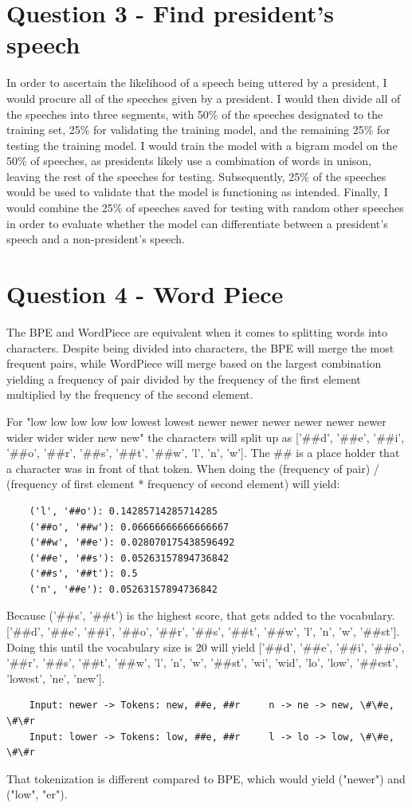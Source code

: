 \documentclass{article}
\begin{document}
\section{Question 3 - Find president's speech}

In order to ascertain the likelihood of a speech being uttered by a president, I would procure all of the speeches given by a president. I would then divide all of the speeches into three segments, with 50\% of the speeches designated to the training set, 25\% for validating the training model, and the remaining 25\% for testing the training model. I would train the model with a bigram model on the 50\% of speeches, as presidents likely use a combination of words in unison, leaving the rest of the speeches for testing. Subsequently, 25\% of the speeches would be used to validate that the model is functioning as intended. Finally, I would combine the 25\% of speeches saved for testing with random other speeches in order to evaluate whether the model can differentiate between a president's speech and a non-president's speech.

\section{Question 4 - Word Piece}

The BPE and WordPiece are equivalent when it comes to splitting words into characters. Despite being divided into characters, the BPE will merge the most frequent pairs, while WordPiece will merge based on the largest combination yielding a frequency of pair divided by the frequency of the first element multiplied by the frequency of the second element.

For "low low low low low lowest lowest newer newer newer newer newer newer wider wider wider new new" the characters will split up as {['\#\#d', '\#\#e', '\#\#i', '\#\#o', '\#\#r', '\#\#s', '\#\#t', '\#\#w', 'l', 'n', 'w']}. The \#\# is a place holder that a character was in front of that token. When doing the (frequency of pair) / (frequency of first element * frequency of second element) will yield:

\begin{verbatim}
    ('l', '##o'): 0.14285714285714285
    ('##o', '##w'): 0.06666666666666667
    ('##w', '##e'): 0.028070175438596492
    ('##e', '##s'): 0.05263157894736842
    ('##s', '##t'): 0.5
    ('n', '##e'): 0.05263157894736842
\end{verbatim}

Because ('\#\#s', '\#\#t') is the highest score, that gets added to the vocabulary. {['\#\#d', '\#\#e', '\#\#i', '\#\#o', '\#\#r', '\#\#s', '\#\#t', '\#\#w', 'l', 'n', 'w', '\#\#st']}. Doing this until the vocabulary size is 20 will yield {['\#\#d', '\#\#e', '\#\#i', '\#\#o', '\#\#r', '\#\#s', '\#\#t', '\#\#w', 'l', 'n', 'w', '\#\#st', 'wi', 'wid', 'lo', 'low', '\#\#est', 'lowest', 'ne', 'new']}. 

\begin{verbatim}
    Input: newer -> Tokens: new, ##e, ##r     n -> ne -> new, \#\#e, \#\#r
    Input: lower -> Tokens: low, ##e, ##r     l -> lo -> low, \#\#e, \#\#r
\end{verbatim}

That tokenization is different compared to BPE, which would yield ("newer") and ("low", "er").
\end{document}

